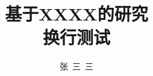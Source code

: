 \documentclass[doctor,chinese,print]{ustcthesis}
\title{基于XXXX的研究\\换行测试}          %
\author{张~三~三}               %
\begin{document}
\maketitle


\frontmatter
{
\linespread{1.25}\selectfont     %
\tableofcontents                 %
\listoffigures                   %
\listoftables                    %
}

\newtheorem{proof_idea}{证明思路}
\newtheorem{thm}{定理}

\mainmatter



\backmatter
\end{document}
